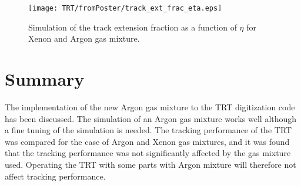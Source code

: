 \begin{figure}[h]
\begin{center}
 \texttt{[image: TRT/fromPoster/track\_ext\_frac\_eta.eps]}
\caption{Simulation of the track extension fraction as a function of $\eta$ for Xenon and Argon gas mixture.}
\label{fig:track_ext_fraction}
\end{center}
\end{figure}

\section{Summary}
\label{sec:trt_summary}

The implementation of the new Argon gas mixture to the TRT digitization code has been discussed. The simulation of an Argon gas mixture works well although 
a fine tuning of the simulation is needed.
The tracking performance of the TRT was compared for the case of Argon and Xenon gas mixtures, and it was found that the tracking performance was not significantly affected
by the gas mixture used. Operating the TRT with some parts with Argon mixture will therefore not affect tracking performance.



